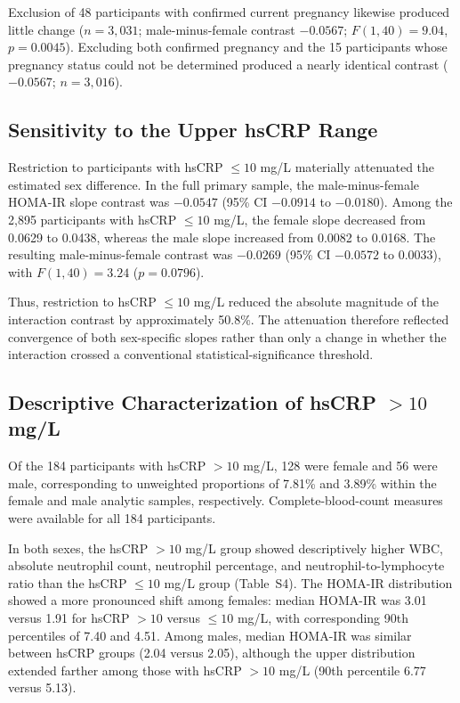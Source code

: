 \documentclass[11pt]{article}
\begin{document}
Exclusion of 48 participants with confirmed current pregnancy likewise
produced little change ($n=3,031$; male-minus-female contrast $-0.0567$;
$F(1,40)=9.04$, $p=0.0045$). Excluding both confirmed pregnancy and the
15 participants whose pregnancy status could not be determined produced a
nearly identical contrast ($-0.0567$; $n=3,016$).

\subsection{Sensitivity to the Upper hsCRP Range}

Restriction to participants with hsCRP $\leq10$ mg/L materially attenuated
the estimated sex difference. In the full primary sample, the
male-minus-female HOMA-IR slope contrast was $-0.0547$ (95\% CI $-0.0914$
to $-0.0180$). Among the 2,895 participants with hsCRP $\leq10$ mg/L, the
female slope decreased from 0.0629 to 0.0438, whereas the male slope increased
from 0.0082 to 0.0168. The resulting male-minus-female contrast was
$-0.0269$ (95\% CI $-0.0572$ to 0.0033), with
$F(1,40)=3.24$ ($p=0.0796$).

Thus, restriction to hsCRP $\leq10$ mg/L reduced the absolute magnitude of
the interaction contrast by approximately 50.8\%. The attenuation therefore
reflected convergence of both sex-specific slopes rather than only a change
in whether the interaction crossed a conventional statistical-significance
threshold.

\subsection{Descriptive Characterization of hsCRP $>10$ mg/L}

Of the 184 participants with hsCRP $>10$ mg/L, 128 were female and 56 were
male, corresponding to unweighted proportions of 7.81\% and 3.89\% within
the female and male analytic samples, respectively. Complete-blood-count
measures were available for all 184 participants.

In both sexes, the hsCRP $>10$ mg/L group showed descriptively higher WBC,
absolute neutrophil count, neutrophil percentage, and
neutrophil-to-lymphocyte ratio than the hsCRP $\leq10$ mg/L group
(Table~S4). The HOMA-IR distribution showed a more pronounced shift among
females: median HOMA-IR was 3.01 versus 1.91 for hsCRP $>10$ versus
$\leq10$ mg/L, with corresponding 90th percentiles of 7.40 and 4.51.
Among males, median HOMA-IR was similar between hsCRP groups (2.04 versus
2.05), although the upper distribution extended farther among those with
hsCRP $>10$ mg/L (90th percentile 6.77 versus 5.13).
\end{document}
